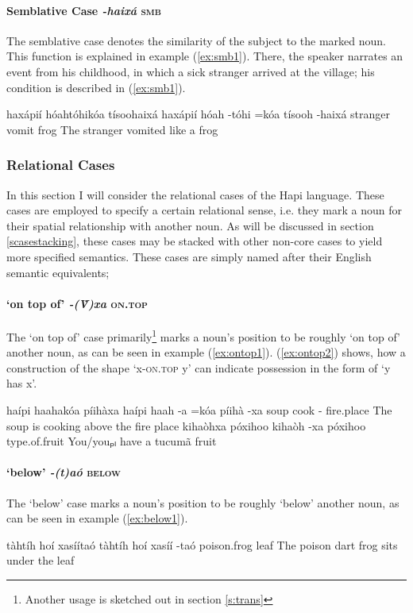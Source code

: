\documentclass[a4paper, 12pt, oneside]{memoir}
\newcommand{\emh}[1]{\textit{#1}}
\begin{document}
\paragraph{Semblative Case \emh{-haixá} \textsc{smb}}
The semblative case denotes the similarity of the subject to the marked noun. This function is explained in example (\ref{ex:smb1}). There, the speaker narrates an event from his childhood, in which a sick stranger arrived at the village; his condition is described in (\ref{ex:smb1}).
\begin{examples}
\ex \label{ex:smb1}
\words haxápií hóahtóhikóa tísoohaixá
\bits haxápií hóah -tóhi =kóa tísooh -haixá
\gloss stranger vomit {\Dpasto} {\Decl} frog {\Smb} 
\tr The stranger vomited like a frog
\end{examples}
\subsubsection{Relational Cases}\label{srelcase}
In this section I will consider the relational cases of the Hapi language. These cases are employed to specify a certain relational sense, i.e. they mark a noun for their spatial relationship with another noun. As will be discussed in section \ref{scasestacking}, these cases may be stacked with other non-core cases to yield more specified semantics. These cases are simply named after their English semantic equivalents;
\paragraph{`on top of' \emh{-(V̀)xa} \textsc{on.top} }
The `on top of' case primarily\footnote{Another usage is sketched out in section \ref{s:trans}} marks a noun's position to be roughly `on top of' another noun, as can be seen in example (\ref{ex:ontop1}). (\ref{ex:ontop2}) shows, how a construction of the shape `x-\textsc{on.top} y' can indicate possession in the form of `y has x'.
\begin{examples}
\ex \label{ex:ontop1}
\words haípi haahakóa píihàxa
\bits haípi haah -a =kóa píihà -xa
\gloss soup cook -{\St} {\Decl} fire.place {\Ont}
\tr The soup is cooking above the fire place
\ex \label{ex:ontop2}
\words kihaòhxa póxihoo
\bits kihaòh -xa póxihoo
\gloss type.of.fruit {\Ont} {\Ss}
\tr You/youₚₗ have a tucumã fruit
\end{examples}
\paragraph{`below' \emh{-(t)aó} \textsc{below}}
The `below' case marks a noun's position to be roughly `below' another noun, as can be seen in example (\ref{ex:below1}).
\begin{examples}
\ex \label{ex:below1}
\words tàhtíh hoí xasíítaó
\bits tàhtíh hoí xasíí -taó
\gloss poison.frog {\Cop} leaf {\Bel}
\tr The poison dart frog sits under the leaf
\end{examples}
\end{document}

